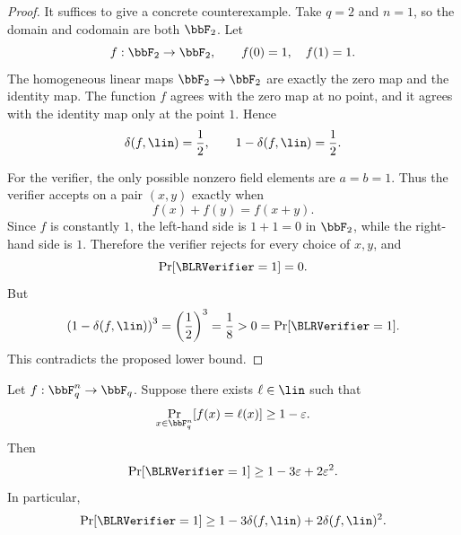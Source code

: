 \begin{proof}
It suffices to give a concrete counterexample. Take $q=2$ and $n=1$, so the domain and
codomain are both $\bbF_2$. Let
\[
    f:\bbF_2\to\bbF_2,
    \qquad
    f(0)=1,\quad f(1)=1.
\]
The homogeneous linear maps $\bbF_2\to\bbF_2$ are exactly the zero map and the identity map.
The function $f$ agrees with the zero map at no point, and it agrees with the identity map
only at the point $1$. Hence
\[
    \delta(f,\lin)=\frac{1}{2},
    \qquad
    1-\delta(f,\lin)=\frac{1}{2}.
\]

For the verifier, the only possible nonzero field elements are $a=b=1$. Thus the verifier
accepts on a pair $(x,y)$ exactly when
\[
    f(x)+f(y)=f(x+y).
\]
Since $f$ is constantly $1$, the left-hand side is $1+1=0$ in $\bbF_2$, while the
right-hand side is $1$. Therefore the verifier rejects for every choice of $x,y$, and
\[
    \Pr[\BLRVerifier=1]=0.
\]
But
\[
    \left(1-\delta(f,\lin)\right)^3
    =
    \left(\frac{1}{2}\right)^3
    =
    \frac{1}{8}
    >
    0
    =
    \Pr[\BLRVerifier=1].
\]
This contradicts the proposed lower bound.
\end{proof}

\begin{theorem}
\label{thm:blr-lower-bound-from-agreement}
Let $f:\bbF_q^n\to\bbF_q$. Suppose there exists $\ell\in\lin$ such that
\[
    \Pr_{x\in\bbF_q^n}[f(x)=\ell(x)]\ge 1-\varepsilon.
\]
Then
\[
    \Pr[\BLRVerifier=1]\ge 1-3\varepsilon+2\varepsilon^2.
\]
In particular,
\[
    \Pr[\BLRVerifier=1]\ge 1-3\delta(f,\lin)+2\delta(f,\lin)^2.
\]
\end{theorem}

